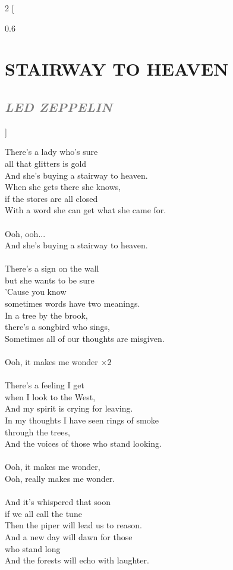 \documentclass[100pt,a4paper]{report}
\newenvironment{song2}[2]
	{	
    	\begin{multicols*}{2}
		[
			\begin{spacing}{0.6}
				\section*{\LARGE\centering \MakeUppercase{\textbf{{#1}}}}
				\subsection*{\Large\centering \textit{\textcolor{gray}{\MakeUppercase{{#2}}}}}
			\end{spacing}
		]
		\Large
	}
	{
	\end{multicols*}
	\newpage
    }
\begin{document}
\begin{song2}{Stairway To Heaven}{Led Zeppelin}
\noindent
There's a lady who's sure\\ 
all that glitters is gold\\
And she's buying a stairway to heaven.\\
When she gets there she knows,\\
if the stores are all closed\\
With a word she can get what she came for.\\
\\
Ooh, ooh...\\ 
And she's buying a stairway to heaven.\\
\\
There's a sign on the wall\\ 
but she wants to be sure\\
'Cause you know\\ 
sometimes words have two meanings.\\
In a tree by the brook,\\ 
there's a songbird who sings,\\
Sometimes all of our thoughts are misgiven.\\
\\
Ooh, it makes me wonder $\times2$\\
\\
There's a feeling I get\\ 
when I look to the West,\\
And my spirit is crying for leaving.\\
In my thoughts I have seen rings of smoke\\
through the trees,\\
And the voices of those who stand looking.\\
\\
Ooh, it makes me wonder,\\
Ooh, really makes me wonder.\\
\\
And it's whispered that soon\\
if we all call the tune\\
Then the piper will lead us to reason.\\
And a new day will dawn for those\\
who stand long\\
And the forests will echo with laughter.\\

\end{song2}
\end{document}

